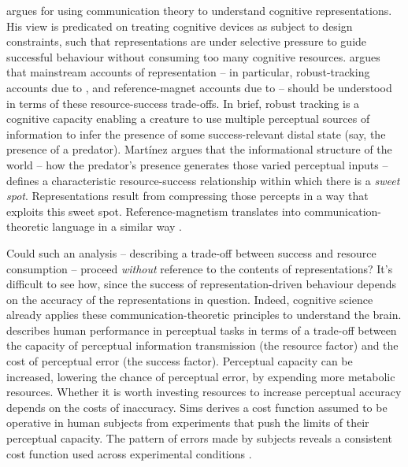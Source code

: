 \documentclass[12pt]{article}
\begin{document}
\citet{martinez2019deception,martinez2019representations} argues for using communication theory to understand cognitive representations.
His view is predicated on treating cognitive devices as subject to design constraints, such that representations are under selective pressure to guide successful behaviour without consuming too many cognitive resources.
\citet{martinez2019representations} argues that mainstream accounts of representation -- in particular, robust-tracking accounts due to \citet{sterelny2003thought,burge2010origins}, and reference-magnet accounts due to \citet{ryder2004sinbad,lewis1984putnam} -- should be understood in terms of these resource-success trade-offs.
In brief, robust tracking is a cognitive capacity enabling a creature to use multiple perceptual sources of information to infer the presence of some success-relevant distal state (say, the presence of a predator).
Mart\'{i}nez argues that the informational structure of the world -- how the predator's presence generates those varied perceptual inputs -- defines a characteristic resource-success relationship within which there is a \textit{sweet spot}.
Representations result from compressing those percepts in a way that exploits this sweet spot.
Reference-magnetism translates into communication-theoretic language in a similar way \citep[1223]{martinez2019representations}.

Could such an analysis -- describing a trade-off between success and resource consumption -- proceed \textit{without} reference to the contents of representations?
It's difficult to see how, since the success of representation-driven behaviour depends on the accuracy of the representations in question.
Indeed, cognitive science already applies these communication-theoretic principles to understand the brain.
\citet{sims2016ratedistortion} describes human performance in perceptual tasks in terms of a trade-off between the capacity of perceptual information transmission (the resource factor) and the cost of perceptual error (the success factor).
Perceptual capacity can be increased, lowering the chance of perceptual error, by expending more metabolic resources.
Whether it is worth investing resources to increase perceptual accuracy depends on the costs of inaccuracy.
Sims derives a cost function assumed to be operative in human subjects from experiments that push the limits of their perceptual capacity.
The pattern of errors made by subjects reveals a consistent cost function used across experimental conditions \citep[188]{sims2016ratedistortion}.
\end{document}
